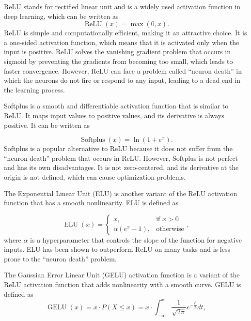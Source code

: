ReLU \cite{nair2010rectified} stands for rectified linear unit and is a widely used activation function in deep learning, which can be written as
\begin{equation}
\label{eq:relu}
\operatorname{ReLU} (x) = \max(0, x).
\end{equation}
ReLU is simple and computationally efficient, making it an attractive choice. It is a one-sided activation function, which means that it is activated only when the input is positive. ReLU solves the vanishing gradient problem that occurs in sigmoid by preventing the gradients from becoming too small, which leads to faster convergence. However, ReLU can face a problem called ``neuron death'' in which the neurons do not fire or respond to any input, leading to a dead end in the learning process.

Softplus \cite{glorot2011deep} is a smooth and differentiable activation function that is similar to ReLU. It maps input values to positive values, and its derivative is always positive. It can be written as

\begin{equation}
\label{eq:softplus}
\operatorname{Softplus} (x) = \ln(1 + e^x).
\end{equation}
Softplus is a popular alternative to ReLU because it does not suffer from the ``neuron death'' problem that occurs in ReLU. However, Softplus is not perfect and has its own disadvantages. It is not zero-centered, and its derivative at the origin is not defined, which can cause optimization problems.



The Exponential Linear Unit (ELU) \cite{clevert2015fast} is another variant of the ReLU activation function that has a smooth nonlinearity. ELU is defined as 

\begin{equation}
\label{eq:elu}
\operatorname{ELU} (x) =
\begin{cases}
x, & \text{if } x > 0 \\
\alpha (e^x - 1), & \text{otherwise}
\end{cases}
,
\end{equation}
where $\alpha$ is a hyperparameter that controls the slope of the function for negative inputs. ELU has been shown to outperform ReLU on many tasks and is less prone to the ``neuron death'' problem.


The Gaussian Error Linear Unit (GELU) \cite{hendrycks2016gaussian} activation function is a variant of the ReLU activation function that adds nonlinearity with a smooth curve. GELU is defined as 
\begin{equation}
\label{eq:gelu}
\operatorname{GELU} \left(x\right) = x\cdot P(X \leq x) = x\cdot \int_{-\infty}^{x} \frac{1}{\sqrt{2\pi}}e^{-\frac{t^2}{2}} dt,
\end{equation}


